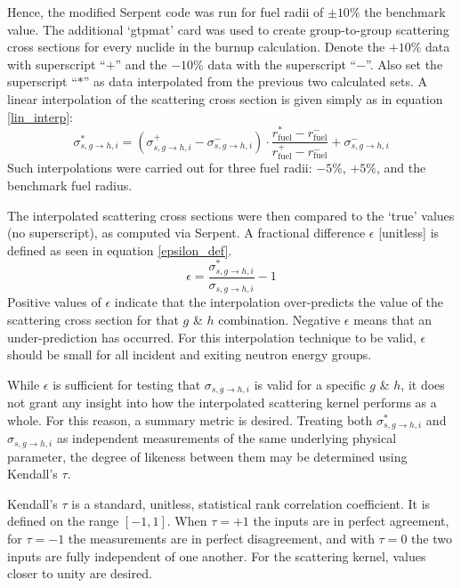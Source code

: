 \documentclass{physor2012}
\begin{document}
Hence, the modified Serpent code was run for fuel radii of $\pm 10\%$
the benchmark value. The additional `gtpmat' card was used to create
group-to-group scattering cross sections for every nuclide in the burnup calculation.
Denote the $+10\%$ data with superscript ``$+$'' and the $-10\%$ data with the
superscript ``$-$''.  Also set the superscript ``$*$'' as data interpolated
from the previous two calculated sets.  A linear interpolation of the
scattering cross section is given simply as in equation \ref{lin_interp}:
\begin{equation}
\label{lin_interp}
\sigma_{s,g\to h,i}^{*} = \left(\sigma_{s,g\to h,i}^{+} - \sigma_{s,g\to h,i}^{-}\right)\cdot
                          \frac{r_{\mbox{fuel}}^{*} - r_{\mbox{fuel}}^{-}}
                               {r_{\mbox{fuel}}^{+} - r_{\mbox{fuel}}^{-}} +
                          \sigma_{s,g\to h,i}^{-}
\end{equation}
Such interpolations were carried out for three fuel radii: $-5\%$, $+5\%$, and the
benchmark fuel radius.

The interpolated scattering cross sections were then compared to the `true'
values (no superscript), as computed via Serpent. A fractional difference
$\epsilon$ [unitless] is defined as seen in equation \ref{epsilon_def}.
\begin{equation}
\label{epsilon_def}
\epsilon = \frac{\sigma_{s,g\to h,i}^{*}}{\sigma_{s,g\to h,i}} - 1
\end{equation}
Positive values of $\epsilon$ indicate that the interpolation over-predicts
the value of the scattering cross section for that $g$ \& $h$ combination.
Negative $\epsilon$ means that an under-prediction has occurred.  For this
interpolation technique to be valid, $\epsilon$ should be small for all
incident and exiting neutron energy groups.

While $\epsilon$ is sufficient for testing that $\sigma_{s,g\to h,i}$ is
valid for a specific $g$ \& $h$, it does not grant any insight into how the
interpolated scattering kernel performs as a whole.  For this reason, a summary
metric is desired.  Treating both $\sigma_{s,g\to h,i}^{*}$ and $\sigma_{s,g\to h,i}$
as independent measurements of the same underlying physical parameter, the degree of
likeness between them may be determined using Kendall's $\tau$.

Kendall's $\tau$ is a standard, unitless, statistical rank correlation coefficient.
It is defined on the range $[-1,1]$.  When $\tau=+1$ the inputs are in perfect agreement,
for $\tau=-1$ the measurements are in perfect disagreement, and with $\tau=0$ the
two inputs are fully independent of one another.  For the scattering kernel,
values closer to unity are desired.
\end{document}
